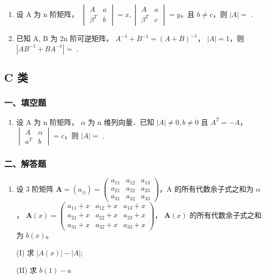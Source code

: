 \documentclass[12pt, a4paper]{ctexart}
\begin{document}
\begin{enumerate}
    \item 设 A 为 n 阶矩阵， $ \begin{vmatrix} A & a \\ \beta^{T} & b \end{vmatrix} = x, \begin{vmatrix} A & a \\ \beta^{T} & c \end{vmatrix} = y $，且 $ b \neq c $，则 $ |A| = $ \underline{\hspace{2cm}}.

    \item 已知 A, B 为 2n 阶可逆矩阵， $ A^{-1} + B^{-1} = (A + B)^{-1} $， $ |A| = 1 $，则 $ \left|AB^{-1} + BA^{-1}\right| = $ \underline{\hspace{2cm}}.
\end{enumerate}

\subsection{C 类}

\subsubsection*{一、填空题}

\begin{enumerate}
    \item 设 A 为 n 阶矩阵， $ \alpha $ 为 n 维列向量．已知 $ |A| \neq 0, b \neq 0 $ 且 $ A^{T} = -A $， $ \begin{vmatrix} A & \alpha \\ a^{T} & b \end{vmatrix} = c $，则 $ |A| = $ \underline{\hspace{2cm}}.
\end{enumerate}

\subsubsection*{二、解答题}

\begin{enumerate}[start=2]
    \item 设 3 阶矩阵 $ \mathbf{A} = \left( a_{ij} \right) = \begin{pmatrix} a_{11} & a_{12} & a_{13} \\ a_{21} & a_{22} & a_{23} \\ a_{31} & a_{32} & a_{33} \end{pmatrix} $，A 的所有代数余子式之和为 $ \alpha $，
    $ \mathbf{A}(x) = \begin{pmatrix} a_{11} + x & a_{12} + x & a_{13} + x \\ a_{21} + x & a_{22} + x & a_{23} + x \\ a_{31} + x & a_{32} + x & a_{33} + x \end{pmatrix} $， $ \mathbf{A}(x) $ 的所有代数余子式之和为 $ b(x) $。
    
    (I) 求 $ \left|A(x)\right|-\left|A\right| $;
    
    (II) 求 $ b(1)-a $
\end{enumerate}
\end{document}
